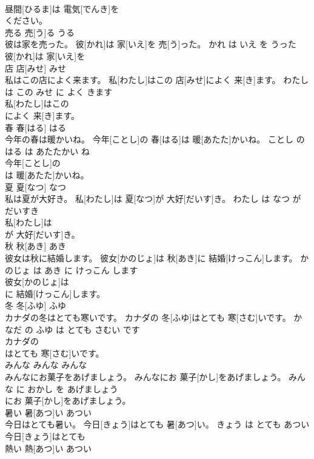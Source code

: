 \documentclass[8pt]{extreport}
\begin{document}
\begin{CJK}{UTF8}{min}
\\	昼間[ひるま]は 電気[でんき]を
\\	ください。			
\\	売る	売[う]る	うる	
\\	彼は家を売った。	彼[かれ]は 家[いえ]を 売[う]った。	かれ は いえ を うった	
\\	彼[かれ]は 家[いえ]を
\\	店	店[みせ]	みせ	
\\	私はこの店によく来ます。	私[わたし]はこの 店[みせ]によく 来[き]ます。	わたし は この みせ に よく きます	
\\	私[わたし]はこの
\\	によく 来[き]ます。			
\\	春	春[はる]	はる	
\\	今年の春は暖かいね。	今年[ことし]の 春[はる]は 暖[あたた]かいね。	ことし の はる は あたたかい ね	
\\	今年[ことし]の
\\	は 暖[あたた]かいね。			
\\	夏	夏[なつ]	なつ	
\\	私は夏が大好き。	私[わたし]は 夏[なつ]が 大好[だいす]き。	わたし は なつ が だいすき	
\\	私[わたし]は
\\	が 大好[だいす]き。			
\\	秋	秋[あき]	あき	
\\	彼女は秋に結婚します。	彼女[かのじょ]は 秋[あき]に 結婚[けっこん]します。	かのじょ は あき に けっこん します	
\\	彼女[かのじょ]は
\\	に 結婚[けっこん]します。			
\\	冬	冬[ふゆ]	ふゆ	
\\	カナダの冬はとても寒いです。	カナダの 冬[ふゆ]はとても 寒[さむ]いです。	かなだ の ふゆ は とても さむい です	
\\	カナダの
\\	はとても 寒[さむ]いです。			
\\	みんな	みんな	みんな	
\\	みんなにお菓子をあげましょう。	みんなにお 菓子[かし]をあげましょう。	みんな に おかし を あげましょう	
\\	にお 菓子[かし]をあげましょう。			
\\	暑い	暑[あつ]い	あつい	
\\	今日はとても暑い。	今日[きょう]はとても 暑[あつ]い。	きょう は とても あつい	
\\	今日[きょう]はとても
\\	熱い	熱[あつ]い	あつい	

\end{CJK}
\end{document}
